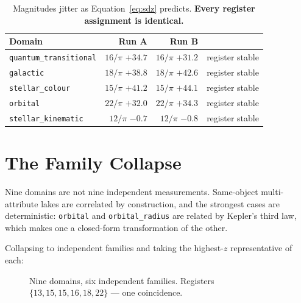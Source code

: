 \documentclass[11pt, letterpaper, openany]{book}
\begin{document}
\begin{table}[H]
\centering
\small
\begin{tabular}{@{}lrrl@{}}
\toprule
\textbf{Domain} & \textbf{Run A} & \textbf{Run B} & \\
\midrule
\texttt{quantum\_transitional} & $16/\pi$ $+34.7$ & $16/\pi$ $+31.2$ & register stable \\
\texttt{galactic} & $18/\pi$ $+38.8$ & $18/\pi$ $+42.6$ & register stable \\
\texttt{stellar\_colour} & $15/\pi$ $+41.2$ & $15/\pi$ $+44.1$ & register stable \\
\texttt{orbital} & $22/\pi$ $+32.0$ & $22/\pi$ $+34.3$ & register stable \\
\texttt{stellar\_kinematic} & $12/\pi$ $-0.7$ & $12/\pi$ $-0.8$ & register stable \\
\bottomrule
\end{tabular}
\caption{Magnitudes jitter as Equation~\ref{eq:sdz} predicts. \textbf{Every register assignment
is identical.}}
\end{table}

\section{The Family Collapse}

\begin{warningbox}
Nine domains are not nine independent measurements. Same-object multi-attribute lakes are
correlated by construction, and the strongest cases are deterministic: \texttt{orbital} and
\texttt{orbital\_radius} are related by Kepler's third law, which makes one a closed-form
transformation of the other.
\end{warningbox}

Collapsing to independent families and taking the highest-$z$ representative of each:

\begin{figure}[H]
\centering
{}
\caption{Nine domains, six independent families. Registers $\{13, 15, 15, 16, 18, 22\}$ --- one
coincidence.}
\end{figure}
\end{document}
